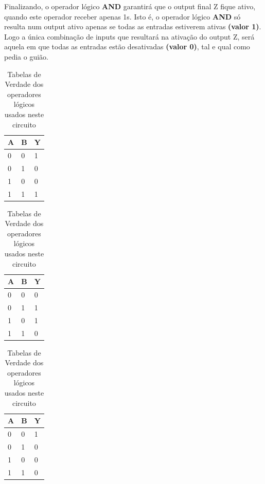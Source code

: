 \documentclass[12pt]{article}
\begin{document}
Finalizando, o operador lógico \textbf{AND} garantirá que o output final Z fique ativo, quando este operador receber apenas 1s. Isto é, o operador lógico \textbf{AND} só resulta num output ativo apenas se todas as entradas estiverem ativas \textbf{(valor 1)}. Logo a única combinação de inputs que resultará na ativação do output Z, será aquela em que todas as entradas estão desativadas \textbf{(valor 0)}, tal e qual como pedia o guião.
\vspace{5mm}
\begin{center}
\begin{table}[H]
\caption{Tabelas de Verdade dos operadores lógicos usados neste circuito}
\begin{minipage}{.20\linewidth}
\centering
{}
\begin{tabular}{|l|l|l|}
\hline
\rowcolor{lightgray}A & B & Y \\ \hline
0 & 0 & \cellcolor{green}1 \\ \hline
0 & 1 & \cellcolor{red}0 \\ \hline
1 & 0 & \cellcolor{red}0 \\ \hline
1 & 1 & \cellcolor{green}1 \\ \hline
\end{tabular}
\end{minipage}%
\hfill
\begin{minipage}{.20\linewidth}
\centering
{}
\begin{tabular}{|l|l|l|}
\hline
\rowcolor{lightgray} A & B & Y \\ \hline
0 & 0 & \cellcolor{red}0 \\ \hline
0 & 1 & \cellcolor{green}1 \\ \hline
1 & 0 & \cellcolor{green}1 \\ \hline
1 & 1 & \cellcolor{red}0 \\ \hline
\end{tabular}
\end{minipage}%
\hfill
\begin{minipage}{.20\linewidth}
\centering
{}
\begin{tabular}{|l|l|l|}
\hline
\rowcolor{lightgray}A & B & Y \\ \hline
0 & 0 & \cellcolor{green}1 \\ \hline
0 & 1 & \cellcolor{red}0 \\ \hline
1 & 0 & \cellcolor{red}0 \\ \hline
1 & 1 & \cellcolor{red}0 \\ \hline

\end{tabular}
\end{minipage}
\end{table}
\end{center}
\end{document}
